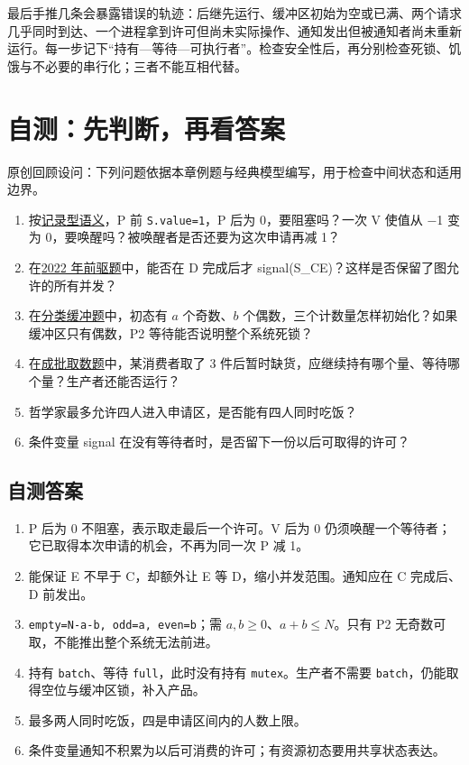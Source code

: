 最后手推几条会暴露错误的轨迹：后继先运行、缓冲区初始为空或已满、两个请求几乎同时到达、一个进程拿到许可但尚未实际操作、通知发出但被通知者尚未重新运行。每一步记下``持有---等待---可执行者''。检查安全性后，再分别检查死锁、饥饿与不必要的串行化；三者不能互相代替。

\section{自测：先判断，再看答案}\label{sec-selfcheck}

原创回顾设问：下列问题依据本章例题与经典模型编写，用于检查中间状态和适用边界。

\begin{enumerate}
\def\labelenumi{\arabic{enumi}.}
\tightlist
\item
  按\hyperref[sec-semaphore]{记录型语义}，P 前 \allowbreak{}\texttt{S.value=1}，P 后为 0，要阻塞吗？一次 V 使值从 −1 变为 0，要唤醒吗？被唤醒者是否还要为这次申请再减 1？
\item
  在\hyperref[ex-2022]{2022 年前驱题}中，能否在 D 完成后才 signal(S\_CE)？这样是否保留了图允许的所有并发？
\item
  在\hyperref[ex-2009]{分类缓冲题}中，初态有 \(a\) 个奇数、\(b\) 个偶数，三个计数量怎样初始化？如果缓冲区只有偶数，P2 等待能否说明整个系统死锁？
\item
  在\hyperref[ex-2014]{成批取数题}中，某消费者取了 3 件后暂时缺货，应继续持有哪个量、等待哪个量？生产者还能否运行？
\item
  哲学家最多允许四人进入申请区，是否能有四人同时吃饭？
\item
  条件变量 signal 在没有等待者时，是否留下一份以后可取得的许可？
\end{enumerate}

\subsection{自测答案}\label{os-c03-h568}

\begin{enumerate}
\def\labelenumi{\arabic{enumi}.}
\tightlist
\item
  P 后为 0 不阻塞，表示取走最后一个许可。V 后为 0 仍须唤醒一个等待者；它已取得本次申请的机会，不再为同一次 P 减 1。
\item
  能保证 E 不早于 C，却额外让 E 等 D，缩小并发范围。通知应在 C 完成后、D 前发出。
\item
  \allowbreak{}\texttt{empty=N-a-b,}\allowbreak{}\texttt{\ odd=a,}\allowbreak{}\texttt{\ even=b}；需 \(a,b\ge0\)、\(a+b\le N\)。只有 P2 无奇数可取，不能推出整个系统无法前进。
\item
  持有 \allowbreak{}\texttt{batch}、等待 \allowbreak{}\texttt{full}，此时没有持有 \allowbreak{}\texttt{mutex}。生产者不需要 \allowbreak{}\texttt{batch}，仍能取得空位与缓冲区锁，补入产品。
\item
  最多两人同时吃饭，四是申请区间内的人数上限。
\item
  条件变量通知不积累为以后可消费的许可；有资源初态要用共享状态表达。
\end{enumerate}

